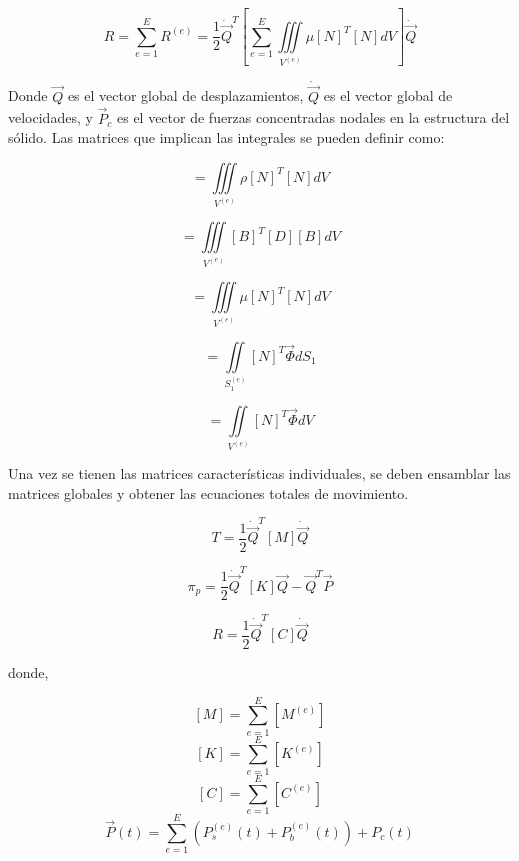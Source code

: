 \begin{equation}
R = \sum\limits_{e=1}^{E} R^{(e)} = \frac{1}{2} \dot{\vec{Q}}^T
\left[
\sum\limits_{e=1}^{E} \iiint\limits_{V^{(e)}} \mu [N]^T [N] dV 
\right]
\dot{\vec{Q}}
\end{equation}

Donde $\vec{Q}$ es el vector global de desplazamientos, $\dot{\vec{Q}}$ es el vector global de velocidades, 
y $\vec{P}_c$ es el vector de fuerzas concentradas nodales en la estructura del sólido. Las matrices que 
implican las integrales se pueden definir como:

\begin{equation}
[M^{(e)}] = \iiint\limits_{V^{(e)}} \rho [N]^T [N] dV
\end{equation}

\begin{equation}
[K^{(e)}] = \iiint\limits_{V^{(e)}} [B]^T [D] [B] dV
\end{equation}

\begin{equation}
[C^{(e)}] = \iiint\limits_{V^{(e)}} \mu [N]^T [N] dV
\end{equation}

\begin{equation}
[P_s^{(e)}] = \iint\limits_{S_1^{(e)}} [N]^T \vec{\Phi} dS_1
\end{equation}

\begin{equation}
[P_b^{(e)}] = \iint\limits_{V^{(e)}} [N]^T \vec{\Phi} dV
\end{equation}

Una vez se tienen las matrices características individuales, se deben  ensamblar las matrices globales y 
obtener las ecuaciones totales de movimiento.

\begin{equation}
T = \frac{1}{2} \dot{\vec{Q}}^T [M] \dot{\vec{Q}}
\end{equation}

\begin{equation}
\pi_p = \frac{1}{2} \dot{\vec{Q}}^T [K] \vec{Q} - \vec{Q}^T \vec{P}
\end{equation}

\begin{equation}
R = \frac{1}{2} \dot{\vec{Q}}^T [C] \dot{\vec{Q}}
\end{equation}

donde, 

$$
[M] = \sum\limits_{e=1}^{E} [M^{(e)}]
$$
$$[K] = \sum\limits_{e=1}^{E} [K^{(e)}]$$
$$[C] = \sum\limits_{e=1}^{E} [C^{(e)}]$$
$$
\vec{P}(t) = \sum\limits_{e=1}^{E} 
\left(
P_s^{(e)}(t) + P_b^{(e)}(t) 
\right)
+ P_c (t)
$$

